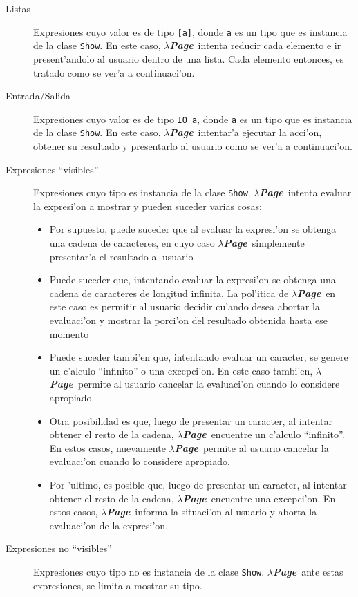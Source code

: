 \documentclass[a4paper]{article}
\newcommand{\hpage}{\textbf{\textsl{$\lambda$Page}}}
\begin{document}
\begin{description}
	\item[Listas] Expresiones cuyo valor es de tipo \texttt{[a]}, donde \texttt{a} es un tipo que es instancia de la clase \texttt{Show}.  En este caso, \hpage\ intenta reducir cada elemento e ir present'andolo al usuario dentro de una lista.  Cada elemento entonces, es tratado como se ver'a a continuaci'on.
	\item[Entrada/Salida] Expresiones cuyo valor es de tipo \texttt{IO a}, donde \texttt{a} es un tipo que es instancia de la clase \texttt{Show}.  En este caso, \hpage\ intentar'a ejecutar la acci'on, obtener su resultado y presentarlo al usuario como se ver'a a continuaci'on.
	\item[Expresiones ``visibles''] Expresiones cuyo tipo es instancia de la clase \texttt{Show}.  \hpage\ intenta evaluar la expresi'on a mostrar y pueden suceder varias cosas:
		\begin{itemize}
			\item Por supuesto, puede suceder que al evaluar la expresi'on se obtenga una cadena de caracteres, en cuyo caso \hpage\ simplemente presentar'a el resultado al usuario
			\item Puede suceder que, intentando evaluar la expresi'on se obtenga una cadena de caracteres de longitud infinita.  La pol'itica de \hpage\ en este caso es permitir al usuario decidir cu'ando desea abortar la evaluaci'on y mostrar la porci'on del resultado obtenida hasta ese momento
			\item Puede suceder tambi'en que, intentando evaluar un caracter, se genere un c'alculo ``infinito'' o una excepci'on.  En este caso tambi'en, \hpage\ permite al usuario cancelar la evaluaci'on cuando lo considere apropiado.
			\item Otra posibilidad es que, luego de presentar un caracter, al intentar obtener el resto de la cadena, \hpage\ encuentre un c'alculo ``infinito''.  En estos casos, nuevamente \hpage\ permite al usuario cancelar la evaluaci'on cuando lo considere apropiado.
			\item Por 'ultimo, es posible que, luego de presentar un caracter, al intentar obtener el resto de la cadena, \hpage\ encuentre una excepci'on.  En estos casos, \hpage\ informa la situaci'on al usuario y aborta la evaluaci'on de la expresi'on.
		\end{itemize}
	\item[Expresiones no ``visibles''] Expresiones cuyo tipo no es instancia de la clase \texttt{Show}.  \hpage\, ante estas expresiones, se limita a mostrar su tipo.
\end{description}
\end{document}
